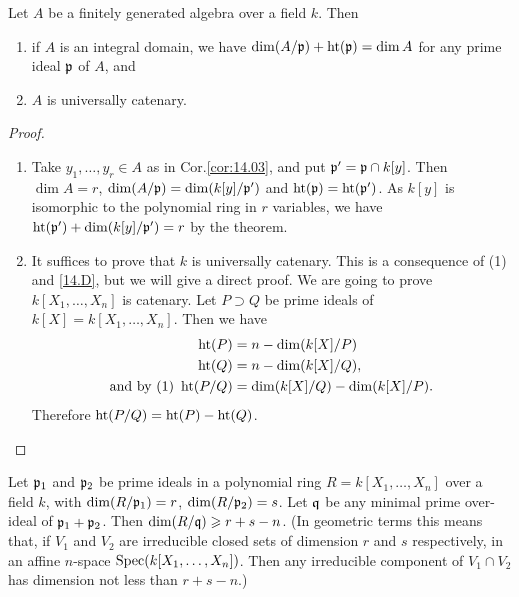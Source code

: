 \documentclass[../main]{subfiles}
\begin{document}
\begin{parcorollary}\label{cor:14.05}
Let $A$ be a finitely generated algebra over a field $k$. Then
\begin{enumerate}[label = (\arabic*)]
    \item if $A$ is an integral domain, we have $\operatorname{dim}(A/\mathfrak{p}) + \operatorname{ht}(\mathfrak{p}) = \operatorname{dim} A$ for any prime ideal $\mathfrak{p}$ of $A$, and
    \item $A$ is universally catenary.
\end{enumerate}
\end{parcorollary}

\begin{proof}
\begin{enumerate}[label = (\arabic*)]
    \item Take $y_1,\ldots,y_r\in A$ as in Cor.\ref{cor:14.03}, and put $\mathfrak{p}'=\mathfrak{p}\cap k[y]$. Then $\dim A =r$, $\operatorname{dim}(A/\mathfrak{p}) = \operatorname{dim}(k[y]/\mathfrak{p}')$ and $\operatorname{ht}(\mathfrak{p})=\operatorname{ht}(\mathfrak{p}')$. As $k[y]$ is isomorphic to the polynomial ring in $r$ variables, we have $\operatorname{ht}(\mathfrak{p}') + \operatorname{dim}(k[y]/\mathfrak{p}') = r$ by the theorem.
    \item It suffices to prove that $k$ is universally catenary. This is a consequence of (1) and \ref{14.D}, but we will give a direct proof. We are going to prove $k[X_1,\ldots,X_n]$ is catenary. Let $P\supset Q$ be prime ideals of $k[X] = k[X_1,\ldots,X_n]$. Then we have
    \begin{align*}
        \operatorname{ht}(P)&=n-\operatorname{dim}(k[X]/P)\\
        \operatorname{ht}(Q)&=n-\operatorname{dim}(k[X]/Q),\\
        \text{and by (1) }\operatorname{ht}(P/Q)&=\operatorname{dim}(k[X]/Q)-\operatorname{dim}(k[X]/P).
    \end{align*}
    Therefore $\operatorname{ht}(P/Q) = \operatorname{ht}(P) - \operatorname{ht}(Q)$.
\end{enumerate}
\end{proof}


\begin{parcorollary}\label{cor:14.06}
Let $\mathfrak{p}_1$ and $\mathfrak{p}_2$ be prime ideals in a polynomial ring $R = k[X_1,\ldots,X_n]$ over a field $k$, with $\operatorname{dim}(R/\mathfrak{p}_1) =r$, $\operatorname{dim}(R/\mathfrak{p}_2) = s$. Let $\mathfrak{q}$ be any minimal prime over-ideal of $\mathfrak{p}_1+\mathfrak{p}_2$. Then $\operatorname{dim}(R/\mathfrak{q})\geqslant r +s -n$. (In geometric terms this means that, if $V_1$ and $V_2$ are irreducible closed sets of dimension $r$ and $s$ respectively, in an affine $n$-space $\operatorname{Spec}(k[X_1,\dots,X_n])$. Then any irreducible component of $V_1\cap V_2$ has dimension not less than $r +s - n$.)
\end{parcorollary}
\end{document}
